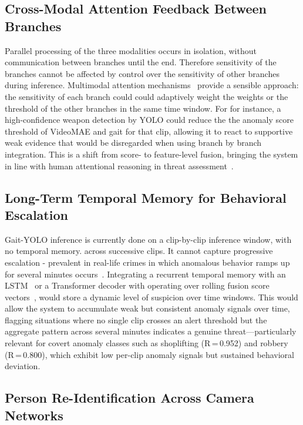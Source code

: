 \documentclass[conference]{IEEEtran}
\begin{document}
\subsection{Cross-Modal Attention Feedback Between Branches}

Parallel processing of the three modalities occurs in isolation,
without communication between branches until the end.
Therefore sensitivity of the branches cannot be affected by
control over the sensitivity of other branches during inference.
Multimodal attention mechanisms~\cite{tsai2019multimodal} provide a
sensible approach: the sensitivity of each branch could
could adaptively weight the weights or the threshold
of the other branches in the same time window.  For
for instance, a high-confidence weapon detection by YOLO could reduce the
the anomaly score threshold of VideoMAE and gait for that clip,
allowing it to react to supportive weak evidence that
would be disregarded when using branch by branch integration.  This
is a shift from score- to feature-level
fusion, bringing the system in line with human
attentional reasoning in threat
assessment~\cite{vaswani2017attention}.

\subsection{Long-Term Temporal Memory for Behavioral Escalation}

Gait-YOLO inference is currently done on a clip-by-clip
inference window, with no temporal memory.
across successive clips.  It cannot capture progressive
escalation - prevalent in real-life crimes
in which anomalous behavior ramps up for several minutes
occurs~\cite{ucfcrime}.
Integrating a recurrent temporal memory with an
LSTM~\cite{hochreiter1997lstm} or a Transformer decoder with
operating over rolling fusion score vectors~\cite{dai2019transformerxl}, would
store a dynamic level of suspicion over time
windows.  This would allow the system to accumulate weak but
consistent anomaly signals over time, flagging situations where no
single clip crosses an alert threshold but the aggregate pattern
across several minutes indicates a genuine threat—particularly
relevant for covert anomaly classes such as shoplifting
(R\,=\,0.952) and robbery (R\,=\,0.800), which exhibit low
per-clip anomaly signals but sustained behavioral deviation.


\subsection{Person Re-Identification Across Camera Networks}
\end{document}
